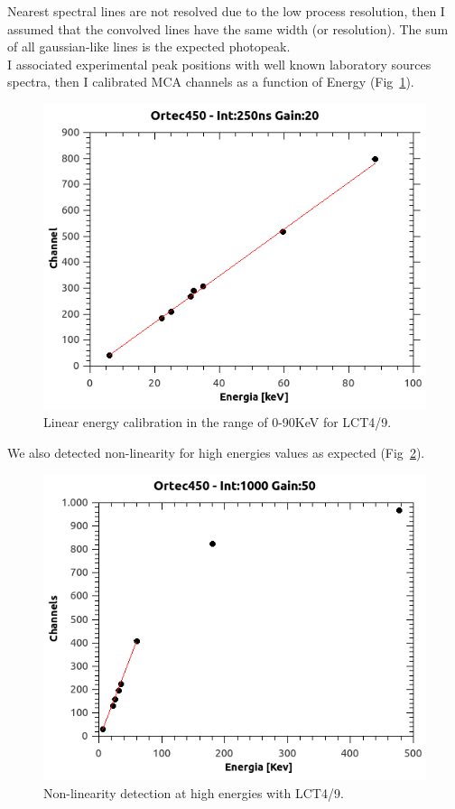 \documentclass[10pt,a4paper, openany]{book}
\begin{document}
Nearest spectral lines are not resolved due to the low process resolution, then I assumed that the convolved lines have the same width (or resolution). The sum of all gaussian-like lines is the expected photopeak.\\
I associated experimental peak positions with well known laboratory sources spectra, then I calibrated MCA channels as a function of Energy (Fig~\ref{fig:lin}). 
\begin{figure}[!h]
\begin{center}
\includegraphics[scale=0.45]{imm/lin.png}
\end{center}
\caption{Linear energy calibration in the range of 0-90KeV for LCT4/9.}
\label{fig:lin}
\end{figure}
We also detected non-linearity for high energies values as expected (Fig~\ref{fig:nl}).
\begin{figure}[!h]
\begin{center}
\includegraphics[scale=0.5]{imm/1000_50_fit.png}
\end{center}
\caption{Non-linearity detection at high energies with LCT4/9.}
\label{fig:nl}
\end{figure}
\newpage
\end{document}
